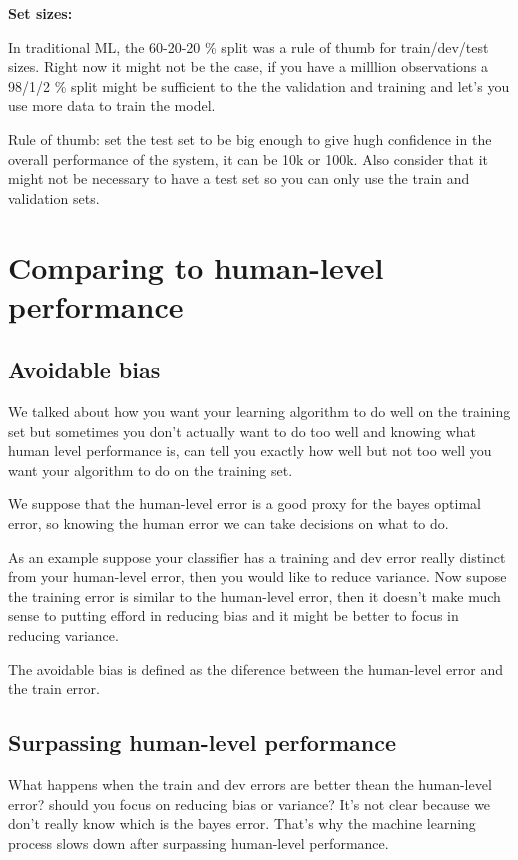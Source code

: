 \textbf{Set sizes:}

In traditional ML, the 60-20-20 \% split was a rule of thumb for train/dev/test sizes.
Right now it might not be the case, if you have a milllion observations a 98/1/2 \% 
split might be sufficient to the the validation and training and let's you use more 
data to train the model.

Rule of thumb: set the test set to be big enough to give hugh confidence in the 
overall performance of the system, it can be 10k or 100k. Also consider that it might
not be necessary to have a test set so you can only use the train and validation sets.

\section{Comparing to human-level performance}
\subsection{Avoidable bias}
We talked about how you want your learning algorithm to do well on the training set 
but sometimes you don't actually want to do too well and knowing what human level 
performance is, can tell you exactly how well but not too well you want your algorithm 
to do on the training set.

We suppose that the human-level error is a good proxy for the bayes optimal error, so 
knowing the human error we can take decisions on what to do. 

As an example suppose your classifier has a training and dev error really distinct 
from your human-level error, then you would like to reduce variance. Now supose the 
training error is similar to the human-level error, then it doesn't make much sense
to putting efford in reducing bias and it might be better to focus in reducing variance.

The avoidable bias is defined as the diference between the human-level error and the
train error.

\subsection{Surpassing human-level performance}

What happens when the train and dev errors are better thean the human-level error?
should you focus on reducing bias or variance? It's not clear because we don't really
know which is the bayes error. That's why the machine learning process slows down 
after surpassing human-level performance.

